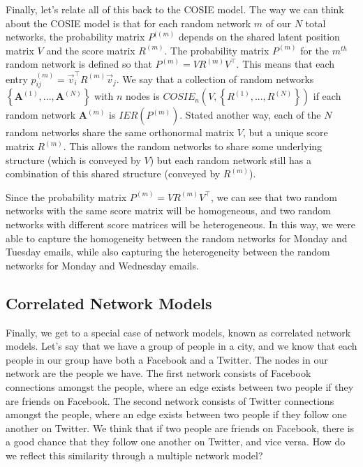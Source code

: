 \documentclass[letterpaper,10pt,english]{jupyterBook}
\begin{document}
\sphinxAtStartPar
Finally, let’s relate all of this back to the COSIE model. The way we can think about the COSIE model is that for each random network \(m\) of our \(N\) total networks, the probability matrix \(P^{((m)}\) depends on the shared latent position matrix \(V\) and the score matrix \(R^{(m)}\). The probability matrix \(P^{(m)}\) for the \(m^{th}\) random network is defined so that \(P^{(m)} = VR^{(m)}V^\top\). This means that each entry \(p_{ij}^{(m)} = \vec v_i^\top R^{(m)} \vec v_j\). We say that a collection of random networks \(\left\{\mathbf A^{(1)}, ..., \mathbf A^{(N)}\right\}\) with \(n\) nodes is \(COSIE_n\left(V, \left\{R^{(1)},...,R^{(N)}\right\}\right)\) if each random network \(\mathbf A^{(m)}\) is \(IER(P^{(m)})\). Stated another way, each of the \(N\) random networks share the same orthonormal matrix \(V\), but a unique score matrix \(R^{(m)}\). This allows the random networks to share some underlying structure (which is conveyed by \(V\)) but each random network still has a combination of this shared structure (conveyed by \(R^{(m)}\)).

\sphinxAtStartPar
Since the probability matrix \(P^{(m)} = VR^{(m)}V^\top\), we can see that two random networks with the same score matrix will be homogeneous, and two random networks with different score matrices will be heterogeneous. In this way, we were able to capture the homogeneity between the random networks for Monday and Tuesday emails, while also capturing the heterogeneity between the random networks for Monday and Wednesday emails.


\subsection{Correlated Network Models}
\label{\detokenize{representations/ch5/multi-network-models:correlated-network-models}}
\sphinxAtStartPar
Finally, we get to a special case of network models, known as correlated network models. Let’s say that we have a group of people in a city, and we know that each people in our group have both a Facebook and a Twitter. The nodes in our network are the people we have. The first network consists of Facebook connections amongst the people, where an edge exists between two people if they are friends on Facebook. The second network consists of Twitter connections amongst the people, where an edge exists between two people if they follow one another on Twitter. We think that if two people are friends on Facebook, there is a good chance that they follow one another on Twitter, and vice versa. How do we reflect this similarity through a multiple network model?
\end{document}
